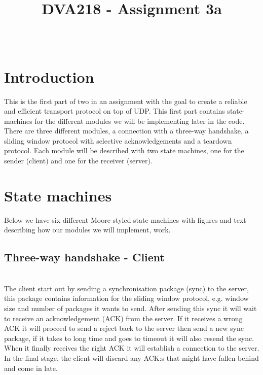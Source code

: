 \documentclass[conference]{IEEEtran}
\begin{document}
\title{DVA218 - Assignment 3a}
\author{
\and
{}
\and
{}}
\maketitle

${}$\hspace{5em}




\section{Introduction}
This is the first part of two in an assignment with the goal to create a reliable and efficient transport protocol on top of UDP. This first part contains state-machines for the different modules we will be implementing later in the code. There are three different modules, a connection with a three-way handshake, a sliding window protocol with selective acknowledgements and a teardown protocol. Each module will be described with two state machines, one for the sender (client) and one for the receiver (server).

\section{State machines}
Below we have six different Moore-styled state machines with figures and text describing how our modules we will implement, work.

\subsection{Three-way handshake - Client}
  

\\
The client start out by sending a synchronisation package (sync) to the server, this package contains information for the sliding window protocol, e.g. window size and number of packages it wants to send. After sending this sync it will wait to receive an acknowledgement (ACK) from the server. If it receives a wrong ACK it will proceed to send a reject back to the server then send a new sync package, if it takes to long time and goes to timeout it will also resend the sync. When it finally receives the right ACK it will establish a connection to the server. In the final stage, the client will discard any ACK:s that might have fallen behind and come in late.  
\end{document}
